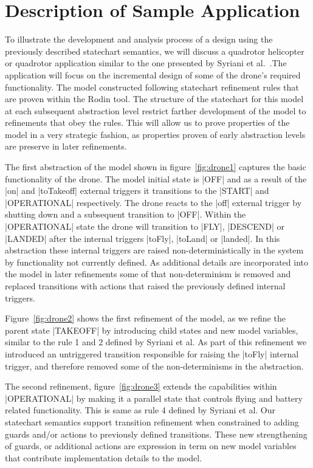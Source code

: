 

\section{Description of Sample Application}

To illustrate the development and analysis process of a design using the previously described 
statechart semantics, we will discuss a quadrotor helicopter or quadrotor application similar to 
the one presented by Syriani et al.~\cite{Syriani_2019}.The application will focus on the incremental 
design of some of the drone's required functionality.
The model constructed following statechart refinement rules that are proven within the Rodin tool.
The structure of the statechart for this model at each subsequent abstraction level restrict farther 
development of the model to refinements that obey the rules. This will allow us to prove properties 
of the model in a very strategic fashion, as properties proven of early abstraction levels 
are preserve in later refinements.

The first abstraction of the model shown in figure~\ref{fig:drone1} captures the basic 
functionality of the drone. The model initial state is |OFF| and as a result of the |on| and 
|toTakeoff| external triggers it transitions to the |START| and |OPERATIONAL| respectively. 
The drone reacts to the |off| external trigger by shutting down and a subsequent transition to |OFF|.
Within the |OPERATIONAL| state the drone will transition to |FLY|, |DESCEND| or |LANDED| 
after the internal triggers |toFly|, |toLand| or |landed|. In this abstraction these internal 
triggers are raised non-deterministically in the system by functionality not currently defined.
As additional details are incorporated into the model in later refinements some of that non-determinism is 
removed and replaced transitions with actions that raised the previously defined internal triggers.

Figure~\ref{fig:drone2} shows the first refinement of the model, as we refine the parent state |TAKEOFF|
by introducing child states and new model variables, similar to the rule 1 and 2 defined by Syriani et al.
As part of this refinement we introduced an untriggered transition responsible for 
raising the |toFly| internal trigger, and therefore removed some of the non-determinisms in the abstraction.

The second refinement, figure~\ref{fig:drone3} extends the capabilities within |OPERATIONAL| by making it a parallel
state that controls flying and battery related functionality. This is same as rule 4 defined by Syriani et al.
Our statechart semantics support transition refinement when constrained to adding guards and/or 
actions to previously defined transitions. These new strengthening of guards, or additional actions are expression in term on new model variables that contribute implementation details to the model.


